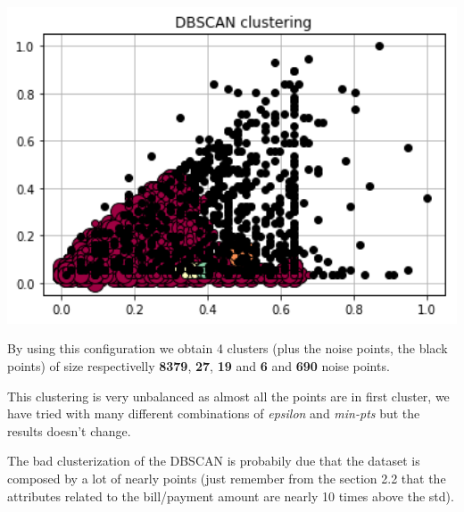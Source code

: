 \begin{center}  
\begin{minipage}[h]{.60\textwidth}    
  \includegraphics[width=1\textwidth]{img/ch3/dbscan_clustering}
\end{minipage}
\end{center}

By using this configuration we obtain 4 clusters (plus the noise points, the black points) of size respectivelly \textbf{8379}, \textbf{27}, \textbf{19} and \textbf{6} and \textbf{690} noise points.

\medskip

This clustering is very unbalanced as almost all the points are in first cluster, we have tried with many different combinations of \textit{epsilon} and \textit{min-pts} but the results doesn't change.

\medskip

The bad clusterization of the DBSCAN is probabily due that the dataset is composed by a lot of nearly points (just remember from the section 2.2 that the attributes related to the bill/payment amount are nearly 10 times above the std).

